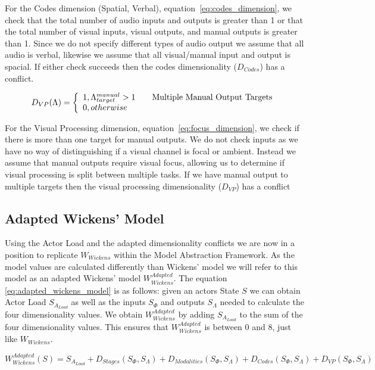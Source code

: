 For the Codes dimension (Spatial, Verbal), equation~\ref{eq:codes_dimension}, we check that the total number of audio inputs and outputs is greater than 1 or that the total number of visual inputs, visual outputs, and manual outputs is greater than 1.  Since we do not specify different types of audio output we assume that all audio is verbal, likewise we assume that all visual/manual input and output is spacial.  If either check succeeds then the codes dimensionality ($D_{Codes}$) has a conflict.

\begin{equation}
D_{VP}(\Lambda) = \left\{ 
  \begin{array}{l l}
    1, \Lambda_{target}^{manual} > 1 & \quad \text{Multiple Manual Output Targets}\\
    0, otherwise
  \end{array}
  \right.
  \label{eq:focus_dimension}
\end{equation}

For the Visual Processing dimension, equation~\ref{eq:focus_dimension}, we check if there is more than one target for manual outputs.  We do not check inputs as we have no way of distinguishing if a visual channel is focal or ambient.  Instead we assume that manual outputs require visual focus, allowing us to determine if visual processing is split between multiple tasks.  If we have manual output to multiple targets then the visual processing dimensionality ($D_{VP}$) has a conflict

\subsection{Adapted Wickens' Model}
Using the Actor Load and the adapted dimensionality conflicts we are now in a position to replicate $W_{Wickens}$ within the Model Abstraction Framework.  As the model values are calculated differently than Wickens' model we will refer to this model as an adapted Wickens' model $W_{Wickens}^{Adapted}$.  The equation \ref{eq:adapted_wickens_model} is as follows: given an actors State $S$ we can obtain Actor Load $S_{A_{Load}}$ as well as the inputs $S_{\Phi}$ and outputs $S_{\Lambda}$ needed to calculate the four dimensionality values.  We obtain $W_{Wickens}^{Adapted}$ by adding $S_{A_{Load}}$  to the sum of the four dimensionality values.  This ensures that $W_{Wickens}^{Adapted}$ is between 0 and 8, just like $W_{Wickens}$.

\begin{equation}
  W_{Wickens}^{Adapted}(S) = S_{A_{Load}} + D_{Stages}(S_{\Phi}, S_{\Lambda}) + D_{Modalities}(S_{\Phi}, S_{\Lambda}) + D_{Codes}(S_{\Phi}, S_{\Lambda}) + D_{VP}(S_{\Phi}, S_{\Lambda})
  \label{eq:adapted_wickens_model}
\end{equation}

